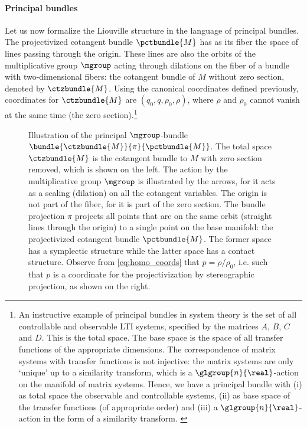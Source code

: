 \paragraph{Principal bundles}
Let us now formalize the Liouville structure in the language of principal bundles. The projectivized cotangent bundle $\pctbundle{M}$ has as its fiber the space of lines passing through the origin. These lines are also the orbits of the multiplicative group $\mgroup$ acting through dilations on the fiber of a bundle with two-dimensional fibers: the cotangent bundle of $M$ without zero section, denoted by $\ctzbundle{M}$. Using the canonical coordinates defined previously, coordinates for $\ctzbundle{M}$ are $(q_0, q, \rho_0, \rho)$, where $\rho$ and $\rho_0$ cannot vanish at the same time (the zero section).\footnote
{An instructive example of principal bundles in system theory is the set of all controllable and observable LTI systems, specified by the matrices $A$, $B$, $C$ and $D$. This is the total space. The base space is the space of all transfer functions of the appropriate dimensions. The correspondence of matrix systems with transfer functions is not injective: the matrix systems are only `unique' up to a similarity transform, which is a $\glgroup{n}{\real}$-action on the manifold of matrix systems. Hence, we have a principal bundle with (i) as total space the observable and controllable systems, (ii) as base space of the transfer functions (of appropriate order) and (iii) a $\glgroup{n}{\real}$-action in the form of a similarity transform. \cite{Hermann1984}}
\begin{figure}[ht!]
    \centering
    
    \caption{Illustration of the principal $\mgroup$-bundle $\bundle{\ctzbundle{M}}{\pi}{\pctbundle{M}}$. The total space $\ctzbundle{M}$ is the cotangent bundle to $M$ with zero section removed, which is shown on the left. The action by the multiplicative group $\mgroup$ is illustrated by the arrows, for it acts as a scaling (dilation) on all the cotangent variables. The origin is not part of the fiber, for it is part of the zero section. The bundle projection $\pi$ projects all points that are on the same orbit (straight lines through the origin) to a single point on the base manifold: the projectivized cotangent bundle $\pctbundle{M}$. The former space has a symplectic structure while the latter space has a contact structure. Observe from \cref{eq:homo_coords} that $p = \rho/\rho_0$, i.e. such that $p$ is a coordinate for the projectivization by stereographic projection, as shown on the right.}
    \label{fig:principal_bundle}
\end{figure}

